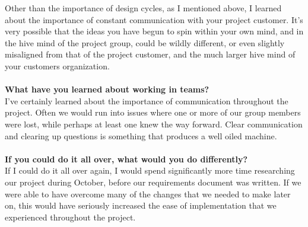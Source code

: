 \documentclass[12pt]{article}
\begin{document}
Other than the importance of design cycles, as I mentioned above, I learned about the importance of constant communication with your project customer. It's very possible that the ideas you have begun to spin within your own mind, and in the hive mind of the project group, could be wildly different, or even slightly misaligned from that of the project customer, and the much larger hive mind of your customers organization. 
\\\\
\textbf{What have you learned about working in teams?}\\
I've certainly learned about the importance of communication throughout the project. Often we would run into issues where one or more of our group members were lost, while perhaps at least one knew the way forward. Clear communication and clearing up questions is something that produces a well oiled machine.
\\\\
\textbf{If you could do it all over, what would you do differently?}\\
If I could do it all over again, I would spend significantly more time researching our project during October, before our requirements document was written. If we were able to have overcome many of the changes that we needed to make later on, this would have seriously increased the ease of implementation that we experienced throughout the project.
\\
\pagebreak
\end{document}
